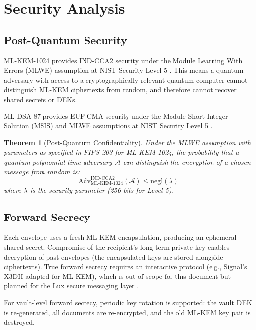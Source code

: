 \documentclass[11pt,a4paper]{article}
\newtheorem{theorem}{Theorem}[section]
\begin{document}
\section{Security Analysis}
\label{sec:security}

\subsection{Post-Quantum Security}

ML-KEM-1024 provides IND-CCA2 security under the Module Learning With
Errors (MLWE) assumption at NIST Security Level 5 \cite{fips203}.  This
means a quantum adversary with access to a cryptographically relevant
quantum computer cannot distinguish ML-KEM ciphertexts from random, and
therefore cannot recover shared secrets or DEKs.

ML-DSA-87 provides EUF-CMA security under the Module Short Integer
Solution (MSIS) and MLWE assumptions at NIST Security Level 5 \cite{fips204}.

\begin{theorem}[Post-Quantum Confidentiality]
Under the MLWE assumption with parameters as specified in FIPS 203 for
ML-KEM-1024, the probability that a quantum polynomial-time adversary
$\mathcal{A}$ can distinguish the encryption of a chosen message from
random is:
\[
  \text{Adv}^{\text{IND-CCA2}}_{\text{ML-KEM-1024}}(\mathcal{A}) \leq \text{negl}(\lambda)
\]
where $\lambda$ is the security parameter (256 bits for Level 5).
\end{theorem}

\subsection{Forward Secrecy}

Each envelope uses a fresh ML-KEM encapsulation, producing an ephemeral
shared secret.  Compromise of the recipient's long-term private key
enables decryption of past envelopes (the encapsulated keys are stored
alongside ciphertexts).  True forward secrecy requires an interactive
protocol (e.g., Signal's X3DH adapted for ML-KEM), which is out of
scope for this document but planned for the Lux secure messaging layer
\cite{lux-messaging}.

For vault-level forward secrecy, periodic key rotation is supported:
the vault DEK is re-generated, all documents are re-encrypted, and the
old ML-KEM key pair is destroyed.
\end{document}
